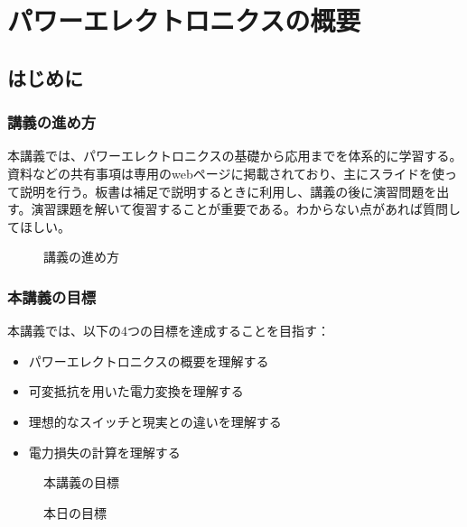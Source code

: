 \chapter{パワーエレクトロニクスの概要}

\section{はじめに}

\subsection{講義の進め方}

本講義では、パワーエレクトロニクスの基礎から応用までを体系的に学習する。資料などの共有事項は専用のwebページに掲載されており、主にスライドを使って説明を行う。板書は補足で説明するときに利用し、講義の後に演習問題を出す。演習課題を解いて復習することが重要である。わからない点があれば質問してほしい。

\begin{figure}[H]
\centering
{}
\caption{講義の進め方}
\label{fig:lecture_method}
\end{figure}

\subsection{本講義の目標}

本講義では、以下の4つの目標を達成することを目指す：

\begin{itemize}
\item パワーエレクトロニクスの概要を理解する
\item 可変抵抗を用いた電力変換を理解する
\item 理想的なスイッチと現実との違いを理解する
\item 電力損失の計算を理解する
\end{itemize}

\begin{figure}[H]
\centering
{}
\caption{本講義の目標}
\label{fig:objectives}
\end{figure}

\begin{figure}[H]
\centering
{}
\caption{本日の目標}
\label{fig:todays_objectives}
\end{figure}


